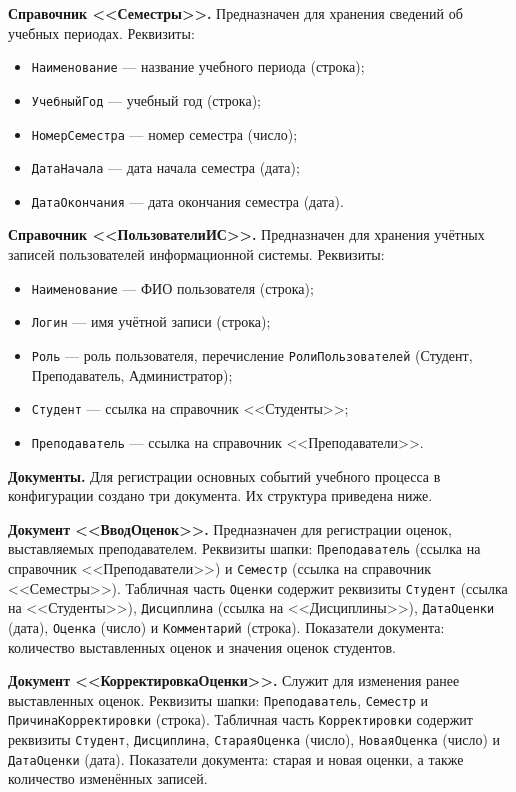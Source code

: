 \documentclass[14pt,a4paper]{extarticle}
\begin{document}
\noindent\textbf{Справочник <<Семестры>>.}
Предназначен для хранения сведений об учебных периодах. Реквизиты:

\begin{itemize}
    \item \texttt{Наименование} --- название учебного периода (строка);
    \item \texttt{УчебныйГод} --- учебный год (строка);
    \item \texttt{НомерСеместра} --- номер семестра (число);
    \item \texttt{ДатаНачала} --- дата начала семестра (дата);
    \item \texttt{ДатаОкончания} --- дата окончания семестра (дата).
\end{itemize}

\noindent\textbf{Справочник <<ПользователиИС>>.}
Предназначен для хранения учётных записей пользователей информационной
системы. Реквизиты:

\begin{itemize}
    \item \texttt{Наименование} --- ФИО пользователя (строка);
    \item \texttt{Логин} --- имя учётной записи (строка);
    \item \texttt{Роль} --- роль пользователя, перечисление
    \texttt{РолиПользователей} (Студент, Преподаватель, Администратор);
    \item \texttt{Студент} --- ссылка на справочник <<Студенты>>;
    \item \texttt{Преподаватель} --- ссылка на справочник <<Преподаватели>>.
\end{itemize}

\noindent\textbf{Документы.}
Для регистрации основных событий учебного процесса в конфигурации создано
три документа. Их структура приведена ниже.

\noindent\textbf{Документ <<ВводОценок>>.}
Предназначен для регистрации оценок, выставляемых преподавателем.
Реквизиты шапки: \texttt{Преподаватель} (ссылка на справочник
<<Преподаватели>>) и \texttt{Семестр} (ссылка на справочник <<Семестры>>).
Табличная часть \texttt{Оценки} содержит реквизиты \texttt{Студент} (ссылка на
<<Студенты>>), \texttt{Дисциплина} (ссылка на <<Дисциплины>>),
\texttt{ДатаОценки} (дата), \texttt{Оценка} (число) и \texttt{Комментарий}
(строка). Показатели документа: количество выставленных оценок и значения
оценок студентов.

\noindent\textbf{Документ <<КорректировкаОценки>>.}
Служит для изменения ранее выставленных оценок. Реквизиты шапки:
\texttt{Преподаватель}, \texttt{Семестр} и \\
\texttt{ПричинаКорректировки} (строка). Табличная часть
\texttt{Корректировки} содержит реквизиты
\texttt{Студент}, \texttt{Дисциплина}, \texttt{СтараяОценка} (число),
\texttt{НоваяОценка} (число) и \texttt{ДатаОценки} (дата). Показатели
документа: старая и новая оценки, а также количество изменённых записей.
\end{document}
